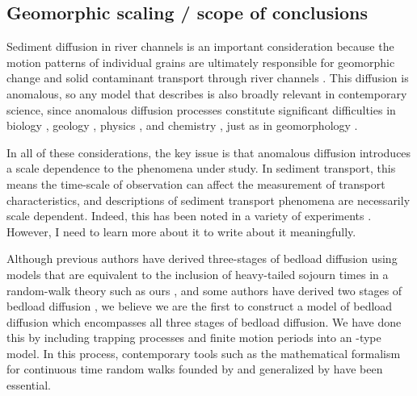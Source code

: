 \documentclass[]{agujournal2018}
\begin{document}
\subsection{Geomorphic scaling / scope of conclusions}
Sediment diffusion in river channels is an important consideration because the motion patterns of individual grains are ultimately responsible for geomorphic change \citep{Hassan2017} and solid contaminant transport through river channels \citep{Malmon2005, Macklin2006}.
This diffusion is anomalous, so any model that describes is also broadly relevant in contemporary science, since anomalous diffusion processes constitute significant difficulties in biology \citep[e.g.][]{Sokolov2012}, geology \citep[e.g.][]{Berkowitz2006}, physics \citep[e.g.][]{Metzler2000}, and chemistry \citep[e.g.][]{Metzler2014}, just as in geomorphology \citep[e.g.][]{Voller2010}.


In all of these considerations, the key issue is that anomalous diffusion introduces a scale dependence to the phenomena under study.
In sediment transport, this means the time-scale of observation can affect the measurement of transport characteristics, and descriptions of sediment transport phenomena are necessarily scale dependent.
Indeed, this has been noted in a variety of experiments \citep{Singh2009,Saletti2015,Campagnol2012}.
However, I need to learn more about it to write about it meaningfully.

Although previous authors have derived three-stages of bedload diffusion using models that are equivalent to the inclusion of heavy-tailed sojourn times in a random-walk theory such as ours \citep[e.g.][]{Zhang2012}, and some authors have derived two stages of bedload diffusion \citep[e.g.][]{Wu2019}, we believe we are the first to construct a model of bedload diffusion which encompasses all three stages of bedload diffusion.
We have done this by including trapping processes and finite motion periods into an \citet{Einstein1937}-type model.
In this process, contemporary tools such as the mathematical formalism for continuous time random walks founded by \citet{Montroll1965} and generalized by \citet{Weiss1976} have been essential.
\end{document}
